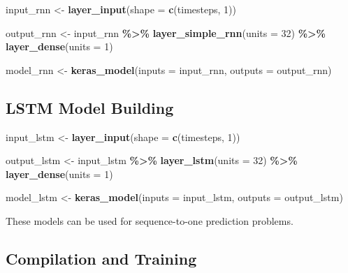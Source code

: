 \documentclass[
]{article}
\newenvironment{Shaded}{\begin{snugshade}}{\end{snugshade}}
\newcommand{\AttributeTok}[1]{\textcolor[rgb]{0.13,0.29,0.53}{#1}}
\newcommand{\DecValTok}[1]{\textcolor[rgb]{0.00,0.00,0.81}{#1}}
\newcommand{\FunctionTok}[1]{\textcolor[rgb]{0.13,0.29,0.53}{\textbf{#1}}}
\newcommand{\NormalTok}[1]{#1}
\newcommand{\OtherTok}[1]{\textcolor[rgb]{0.56,0.35,0.01}{#1}}
\newcommand{\SpecialCharTok}[1]{\textcolor[rgb]{0.81,0.36,0.00}{\textbf{#1}}}
\begin{document}
\begin{Shaded}
\begin{Highlighting}[]
\NormalTok{input\_rnn }\OtherTok{\textless{}{-}} \FunctionTok{layer\_input}\NormalTok{(}\AttributeTok{shape =} \FunctionTok{c}\NormalTok{(timesteps, }\DecValTok{1}\NormalTok{))}

\NormalTok{output\_rnn }\OtherTok{\textless{}{-}}\NormalTok{ input\_rnn }\SpecialCharTok{\%\textgreater{}\%}
  \FunctionTok{layer\_simple\_rnn}\NormalTok{(}\AttributeTok{units =} \DecValTok{32}\NormalTok{) }\SpecialCharTok{\%\textgreater{}\%}
  \FunctionTok{layer\_dense}\NormalTok{(}\AttributeTok{units =} \DecValTok{1}\NormalTok{)}

\NormalTok{model\_rnn }\OtherTok{\textless{}{-}} \FunctionTok{keras\_model}\NormalTok{(}\AttributeTok{inputs =}\NormalTok{ input\_rnn, }\AttributeTok{outputs =}\NormalTok{ output\_rnn)}
\end{Highlighting}
\end{Shaded}

\subsection{LSTM Model Building}\label{lstm-model-building}

\begin{Shaded}
\begin{Highlighting}[]
\NormalTok{input\_lstm }\OtherTok{\textless{}{-}} \FunctionTok{layer\_input}\NormalTok{(}\AttributeTok{shape =} \FunctionTok{c}\NormalTok{(timesteps, }\DecValTok{1}\NormalTok{))}

\NormalTok{output\_lstm }\OtherTok{\textless{}{-}}\NormalTok{ input\_lstm }\SpecialCharTok{\%\textgreater{}\%}
  \FunctionTok{layer\_lstm}\NormalTok{(}\AttributeTok{units =} \DecValTok{32}\NormalTok{) }\SpecialCharTok{\%\textgreater{}\%}
  \FunctionTok{layer\_dense}\NormalTok{(}\AttributeTok{units =} \DecValTok{1}\NormalTok{)}

\NormalTok{model\_lstm }\OtherTok{\textless{}{-}} \FunctionTok{keras\_model}\NormalTok{(}\AttributeTok{inputs =}\NormalTok{ input\_lstm, }\AttributeTok{outputs =}\NormalTok{ output\_lstm)}
\end{Highlighting}
\end{Shaded}

These models can be used for sequence-to-one prediction problems.

\subsection{\texorpdfstring{\textbf{Compilation and
Training}}{Compilation and Training}}\label{compilation-and-training}
\end{document}
